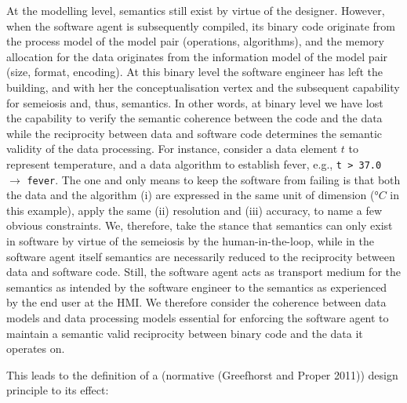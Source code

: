 \documentclass[a4paper,11pt,oneside,oldfontcommands]{memoir}
\theoremstyle{definition}
\theoremstyle{break}		%
\numberwithin{equation}{chapter}
\numberwithin{figure}{chapter}
\begin{document}
At the modelling level, semantics still exist by virtue of the designer.
However, when the software agent is subsequently compiled, its binary
code originate from the process model of the model pair (operations,
algorithms), and the memory allocation for the data originates from the
information model of the model pair (size, format, encoding). At this
binary level the software engineer has left the building, and with her
the conceptualisation vertex and the subsequent capability for semeiosis
and, thus, semantics. In other words, at binary level we have lost the
capability to verify the semantic coherence between the code and the
data while the reciprocity between data and software code determines the
semantic validity of the data processing. For instance, consider a data
element \(t\) to represent temperature, and a data algorithm to
establish fever, e.g., \texttt{t\ \textgreater{}\ 37.0} \(\to\)
\texttt{fever}. The one and only means to keep the software from failing
is that both the data and the algorithm (i) are expressed in the same
unit of dimension (\(\si{\degree}C\) in this example), apply the same
(ii) resolution and (iii) accuracy, to name a few obvious constraints.
We, therefore, take the stance that semantics can only exist in software
by virtue of the semeiosis by the human-in-the-loop, while in the
software agent itself semantics are necessarily reduced to the
reciprocity between data and software code. Still, the software agent
acts as transport medium for the semantics as intended by the software
engineer to the semantics as experienced by the end user at the HMI. We
therefore consider the coherence between data models and data processing
models essential for enforcing the software agent to maintain a semantic
valid reciprocity between binary code and the data it operates on.

This leads to the definition of a (normative (Greefhorst and Proper
2011)) design principle to its effect:
\end{document}
